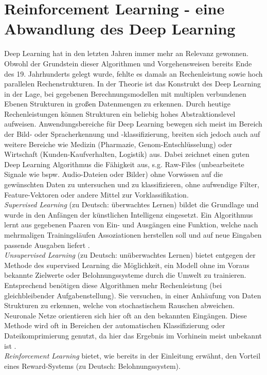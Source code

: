 \section{Reinforcement Learning - eine Abwandlung des Deep Learning}
\label{sec:rl_dl}
	Deep Learning hat in den letzten Jahren immer mehr an Relevanz gewonnen. Obwohl der Grundstein dieser Algorithmen und Vorgehensweisen bereits Ende des 19. Jahrhunderts gelegt wurde, fehlte es damals an Rechenleistung sowie hoch parallelen Rechenstrukturen. In der Theorie ist das Konstrukt des Deep Learning in der Lage, bei gegebenen Berechnungsmodellen mit multiplen verbundenen Ebenen Strukturen in großen Datenmengen zu erkennen. Durch heutige Rechenleistungen können Strukturen ein beliebig hohes Abstraktionslevel aufweisen. Anwendungsbereiche für Deep Learning bewegen sich meist im Bereich der Bild- oder Spracherkennung und -klassifizierung, breiten sich jedoch auch auf weitere Bereiche wie Medizin (Pharmazie, Genom-Entschlüsselung) oder Wirtschaft (Kunden-Kaufverhalten, Logistik) aus. Dabei zeichnet einen guten Deep Learning Algorithmus die Fähigkeit aus, s.g. Raw-Files (unbearbeitete Signale wie bspw. Audio-Dateien oder Bilder) ohne Vorwissen auf die gewünschten Daten zu untersuchen und zu klassifizieren, ohne aufwendige Filter, Feature-Vektoren oder andere Mittel zur Vorklassifikation.\\	
	\textit{Supervised Learning} (zu Deutsch: überwachtes Lernen) bildet die Grundlage und wurde in den Anfängen der künstlichen Intelligenz eingesetzt. Ein Algorithmus lernt aus gegebenen Paaren von Ein- und Ausgängen eine Funktion, welche nach mehrmaligen Trainingsläufen Assoziationen herstellen soll und auf neue Eingaben passende Ausgaben liefert \cite{DeepLearning}.\\
	\textit{Unsupervised Learning} (zu Deutsch: unüberwachtes Lernen) bietet entgegen der Methode des supervised Learning die Möglichkeit, ein Modell ohne im Voraus bekannte Zielwerte oder Belohnungssysteme durch die Umwelt zu trainieren. Entsprechend benötigen diese Algorithmen mehr Rechenleistung (bei gleichbleibender Aufgabenstellung). Sie versuchen, in einer Anhäufung von Daten Strukturen zu erkennen, welche von stochastischem Rauschen abweichen. Neuronale Netze orientieren sich hier oft an den bekannten Eingängen. Diese Methode wird oft in Bereichen der automatischen Klassifizierung oder Dateikomprimierung genutzt, da hier das Ergebnis im Vorhinein meist unbekannt ist \cite{DeepLearning}.\\
	\textit{Reinforcement Learning} bietet, wie bereits in der Einleitung erwähnt, den Vorteil eines Reward-Systems (zu Deutsch: Belohnungssystem).
